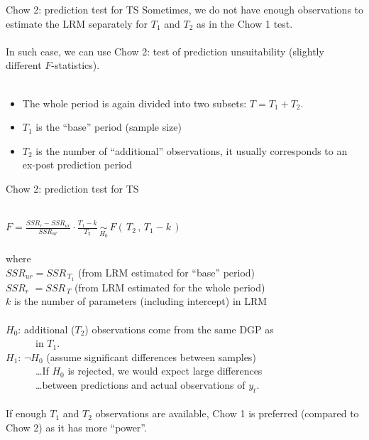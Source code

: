 \documentclass{beamer}
\begin{document}
\begin{frame}{Chow 2: prediction test for TS}
Sometimes, we do not have enough observations to estimate the LRM separately for $T_1$ and $T_2$ as in the Chow 1 test.\\
~\\
In such case, we can use Chow 2: test of prediction unsuitability (slightly different $F$-statistics). \\
~\\
\begin{itemize}
\item The whole period is again divided into two subsets: $T = T_1 + T_2$. 
\item $T_1$ is the ``base'' period (sample size)
\item $T_2$ is the number of ``additional'' observations, it usually corresponds to an ex-post prediction period
\end{itemize}
\end{frame}

\begin{frame}{Chow 2: prediction test for TS}

~\\
$F = \frac{\textit{SSR}_{r}-\textit{SSR}_{ur}}{\textit{SSR}_{ur}}
   \cdot \frac{T_1-k}{T_2} \,
   \underset{H_0}{\sim} \,
   F(\,T_2 \,,\, T_1\!-\!k \, ) $ \\
~ \\
where\\
$\textit{SSR}_{ur} = \textit{SSR}_{\,T_1} $ (from LRM estimated for ``base'' period)\\
$\textit{SSR}_{r} \,\,= \textit{SSR}_{\,T}$  (from LRM estimated for the whole period)\\
$k$ is the number of parameters (including intercept) in LRM\\
~ \\
$H_0$: additional ($T_2$) observations come from the same DGP as\\ 
~~~~~~in $T_1$.\\
$H_1$: $\neg H_0$ (assume significant differences between samples)\\
~~~~~~\dots If $H_0$ is rejected, we would expect large differences\\
~~~~~~\dots between predictions and actual observations of $y_t$.\\
~ \\
\footnotesize{
If enough $T_1$ and $T_2$ observations are available, Chow 1 is preferred (compared to Chow 2) as it has more ``power''.}

\end{frame}
\end{document}
